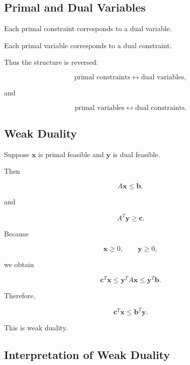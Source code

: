 \subsection{Primal and Dual Variables}
\label{subsec:primal-dual-variables}

Each primal constraint corresponds to a dual variable.

Each primal variable corresponds to a dual constraint.

Thus the structure is reversed:

\[
\boxed{
\text{primal constraints}
\longleftrightarrow
\text{dual variables},
}
\]

and

\[
\boxed{
\text{primal variables}
\longleftrightarrow
\text{dual constraints}.
}
\]

\subsection{Weak Duality}
\label{subsec:weak-duality}

Suppose \(\mathbf{x}\) is primal feasible and \(\mathbf{y}\) is dual
feasible.

Then

\[
A\mathbf{x}\leq\mathbf{b},
\]

and

\[
A^T\mathbf{y}\geq\mathbf{c}.
\]

Because

\[
\mathbf{x}\geq0,
\qquad
\mathbf{y}\geq0,
\]

we obtain

\[
\mathbf{c}^T\mathbf{x}
\leq
\mathbf{y}^TA\mathbf{x}
\leq
\mathbf{y}^T\mathbf{b}.
\]

Therefore,

\[
\boxed{
\mathbf{c}^T\mathbf{x}
\leq
\mathbf{b}^T\mathbf{y}.
}
\]

This is weak duality.

\subsection{Interpretation of Weak Duality}
\label{subsec:weak-duality-interpretation}

